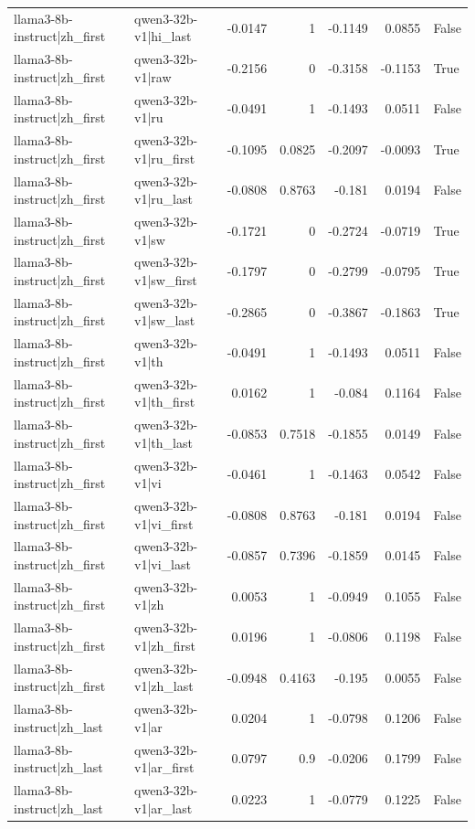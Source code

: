 \begin{table}
\begin{tabular}{l l r r r r l}
llama3-8b-instruct|zh_first & qwen3-32b-v1|hi_last & -0.0147 & 1 & -0.1149 & 0.0855 & False \\
llama3-8b-instruct|zh_first & qwen3-32b-v1|raw & -0.2156 & 0 & -0.3158 & -0.1153 & True \\
llama3-8b-instruct|zh_first & qwen3-32b-v1|ru & -0.0491 & 1 & -0.1493 & 0.0511 & False \\
llama3-8b-instruct|zh_first & qwen3-32b-v1|ru_first & -0.1095 & 0.0825 & -0.2097 & -0.0093 & True \\
llama3-8b-instruct|zh_first & qwen3-32b-v1|ru_last & -0.0808 & 0.8763 & -0.181 & 0.0194 & False \\
llama3-8b-instruct|zh_first & qwen3-32b-v1|sw & -0.1721 & 0 & -0.2724 & -0.0719 & True \\
llama3-8b-instruct|zh_first & qwen3-32b-v1|sw_first & -0.1797 & 0 & -0.2799 & -0.0795 & True \\
llama3-8b-instruct|zh_first & qwen3-32b-v1|sw_last & -0.2865 & 0 & -0.3867 & -0.1863 & True \\
llama3-8b-instruct|zh_first & qwen3-32b-v1|th & -0.0491 & 1 & -0.1493 & 0.0511 & False \\
llama3-8b-instruct|zh_first & qwen3-32b-v1|th_first & 0.0162 & 1 & -0.084 & 0.1164 & False \\
llama3-8b-instruct|zh_first & qwen3-32b-v1|th_last & -0.0853 & 0.7518 & -0.1855 & 0.0149 & False \\
llama3-8b-instruct|zh_first & qwen3-32b-v1|vi & -0.0461 & 1 & -0.1463 & 0.0542 & False \\
llama3-8b-instruct|zh_first & qwen3-32b-v1|vi_first & -0.0808 & 0.8763 & -0.181 & 0.0194 & False \\
llama3-8b-instruct|zh_first & qwen3-32b-v1|vi_last & -0.0857 & 0.7396 & -0.1859 & 0.0145 & False \\
llama3-8b-instruct|zh_first & qwen3-32b-v1|zh & 0.0053 & 1 & -0.0949 & 0.1055 & False \\
llama3-8b-instruct|zh_first & qwen3-32b-v1|zh_first & 0.0196 & 1 & -0.0806 & 0.1198 & False \\
llama3-8b-instruct|zh_first & qwen3-32b-v1|zh_last & -0.0948 & 0.4163 & -0.195 & 0.0055 & False \\
llama3-8b-instruct|zh_last & qwen3-32b-v1|ar & 0.0204 & 1 & -0.0798 & 0.1206 & False \\
llama3-8b-instruct|zh_last & qwen3-32b-v1|ar_first & 0.0797 & 0.9 & -0.0206 & 0.1799 & False \\
llama3-8b-instruct|zh_last & qwen3-32b-v1|ar_last & 0.0223 & 1 & -0.0779 & 0.1225 & False \\

\end{tabular}
\end{table}
